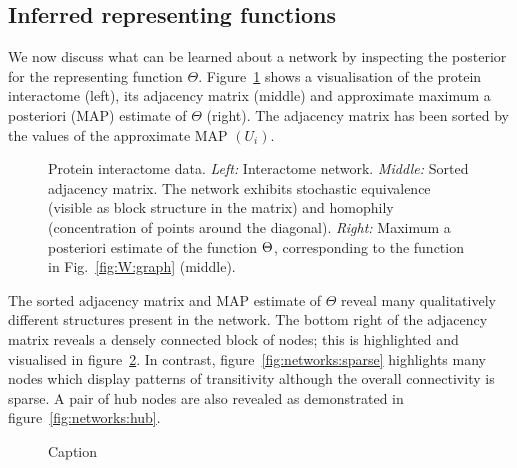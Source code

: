 
\subsection{Inferred representing functions}

We now discuss what can be learned about a network by inspecting the posterior for the representing function $\Theta$.
Figure~\ref{fig:(R)GPLVM_Comparison} shows a visualisation of the protein interactome (left), its adjacency matrix (middle) and approximate maximum a posteriori (MAP) estimate of $\Theta$ (right).
The adjacency matrix has been sorted by the values of the approximate MAP $(U_i)$.

\begin{figure}[ht]
  \centering
  
  \vspace{-0.5cm}
  \caption{Protein interactome data. 
    \emph{Left:} Interactome network. 
    \emph{Middle:} Sorted adjacency matrix. The network exhibits stochastic equivalence 
    (visible as block structure in the matrix) and homophily (concentration of points around the diagonal). 
    \emph{Right:} Maximum a posteriori estimate of the function $\Theta$, corresponding to the function in Fig.~\ref{fig:W:graph} (middle).
  }
  \label{fig:(R)GPLVM_Comparison}
\end{figure}

The sorted adjacency matrix and MAP estimate of $\Theta$ reveal many qualitatively different structures present in the network.
The bottom right of the adjacency matrix reveals a densely connected block of nodes; this is highlighted and visualised in figure~\ref{fig:networks:block}.
In contrast, figure~\ref{fig:networks:sparse} highlights many nodes which display patterns of transitivity although the overall connectivity is sparse.
A pair of hub nodes are also revealed as demonstrated in figure~\ref{fig:networks:hub}.

\begin{figure}[ht]
  \centering
{}
  \caption{Caption}
  \label{fig:networks:block}
\end{figure}

